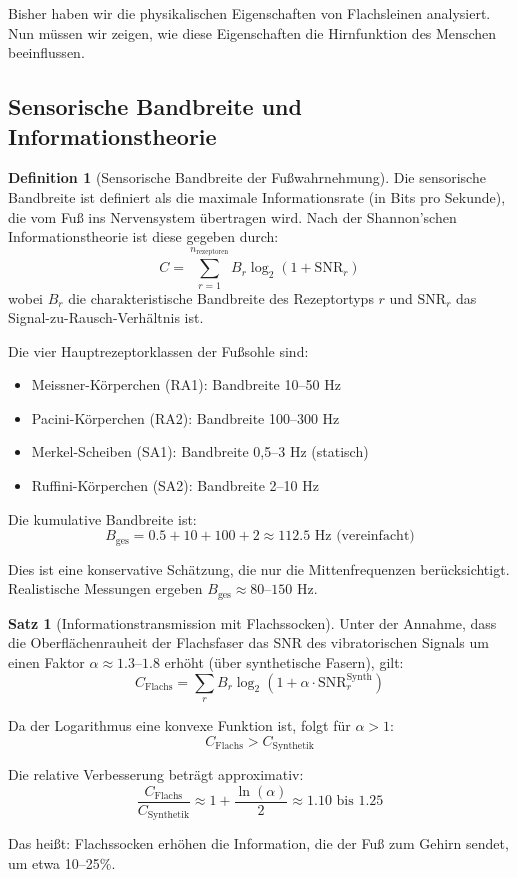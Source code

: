 \documentclass[a4paper,12pt]{article}
\theoremstyle{definition}
\newtheorem{definition}{Definition}
\newtheorem{satz}{Satz}
\begin{document}
Bisher haben wir die physikalischen Eigenschaften von Flachsleinen analysiert. Nun müssen wir zeigen, wie diese Eigenschaften die Hirnfunktion des Menschen beeinflussen.

\subsection{Sensorische Bandbreite und Informationstheorie}

\begin{definition}[Sensorische Bandbreite der Fußwahrnehmung]
Die sensorische Bandbreite ist definiert als die maximale Informationsrate (in Bits pro Sekunde), die vom Fuß ins Nervensystem übertragen wird. Nach der Shannon'schen Informationstheorie ist diese gegeben durch:
\[
C = \sum_{r=1}^{n_{\text{rezeptoren}}} B_r \log_2(1 + \text{SNR}_r)
\]
wobei $B_r$ die charakteristische Bandbreite des Rezeptortyps $r$ und $\text{SNR}_r$ das Signal-zu-Rausch-Verhältnis ist.

Die vier Hauptrezeptorklassen der Fußsohle sind:
\begin{itemize}
    \item[-] Meissner-Körperchen (RA1): Bandbreite 10--50 Hz
    \item[-] Pacini-Körperchen (RA2): Bandbreite 100--300 Hz
    \item[-] Merkel-Scheiben (SA1): Bandbreite 0,5--3 Hz (statisch)
    \item[-] Ruffini-Körperchen (SA2): Bandbreite 2--10 Hz
\end{itemize}

Die kumulative Bandbreite ist:
\[
B_{\text{ges}} = 0.5 + 10 + 100 + 2 \approx 112.5 \text{ Hz (vereinfacht)}
\]

Dies ist eine konservative Schätzung, die nur die Mittenfrequenzen berücksichtigt. Realistische Messungen ergeben $B_{\text{ges}} \approx 80$--$150$ Hz.
\end{definition}

\begin{satz}[Informationstransmission mit Flachssocken]
Unter der Annahme, dass die Oberflächenrauheit der Flachsfaser das SNR des vibratorischen Signals um einen Faktor $\alpha \approx 1.3$--$1.8$ erhöht (über synthetische Fasern), gilt:
\[
C_{\text{Flachs}} = \sum_{r} B_r \log_2(1 + \alpha \cdot \text{SNR}_r^{\text{Synth}})
\]

Da der Logarithmus eine konvexe Funktion ist, folgt für $\alpha > 1$:
\[
C_{\text{Flachs}} > C_{\text{Synthetik}}
\]

Die relative Verbesserung beträgt approximativ:
\[
\frac{C_{\text{Flachs}}}{C_{\text{Synthetik}}} \approx 1 + \frac{\ln(\alpha)}{2} \approx 1.10 \text{ bis } 1.25
\]

Das heißt: Flachssocken erhöhen die Information, die der Fuß zum Gehirn sendet, um etwa 10--25\%.
\end{satz}
\end{document}
